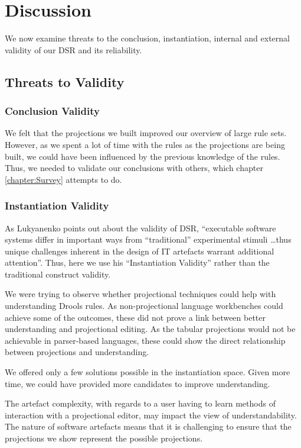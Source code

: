 \section{Discussion}
\label{section:dsr_discussion}

We now examine threats to the conclusion, instantiation, internal and external validity of our DSR and its reliability.

\subsection{Threats to Validity} 

\subsubsection{Conclusion Validity}
We felt that the projections we built improved our overview of large rule sets.
However, as we spent a lot of time with the rules as the projections are being built, we could have been influenced by the previous knowledge of the rules.
Thus, we needed to validate our conclusions with others, which chapter \ref{chapter:Survey} attempts to do.

\subsubsection{Instantiation Validity}
As Lukyanenko\cite{Lukyanenko_2014} points out about the validity of DSR, ``executable software systems differ in important ways from ``traditional'' experimental stimuli \dots thus unique challenges inherent in the design of IT artefacts warrant additional attention''.
Thus, here we use his ``Instantiation Validity'' rather than the traditional construct validity.

We were trying to observe whether projectional techniques could help with understanding Drools rules. 
As non-projectional language workbenches could achieve some of the outcomes, these did not prove a link between better understanding and projectional editing.
As the tabular projections would not be achievable in parser-based languages, these could show the direct relationship between projections and understanding.

We offered only a few solutions possible in the instantiation space.
Given more time, we could have provided more candidates to improve understanding.

The artefact complexity, with regards to a user having to learn methods of interaction with a projectional editor, may impact the view of understandability.
The nature of software artefacts means that it is challenging to ensure that the projections we show represent the possible projections.

